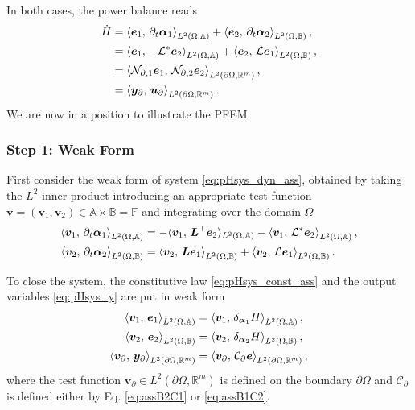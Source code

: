 In both cases, the power balance reads
\begin{equation}\label{eq:powbal_2}
\begin{aligned}
\dot{H} &= \inner[L^2(\Omega, \mathbb{A})]{\bm{e}_1}{\partial_{t} \bm{\alpha}_1} + \inner[L^2(\Omega, \mathbb{B})]{\bm{e}_2}{\partial_{t} \bm{\alpha}_2}, \\
&=\inner[L^2(\Omega, \mathbb{A})]{\bm{e}_1}{-\mathcal{L}^* \bm{e}_2} + \inner[L^2(\Omega, \mathbb{B})]{\bm{e}_2}{\mathcal{L} \bm{e}_1}, \\
&= \inner[L^2(\partial \Omega, \mathbb{R}^m)]{\mathcal{N}_{\partial, 1} \bm{e}_1}{\mathcal{N}_{\partial, 2} \bm{e}_2}, \\
&= \inner[L^2(\partial \Omega, \mathbb{R}^m)]{\bm{y}_\partial}{\bm{u}_\partial}.
\end{aligned}
\end{equation}
We are now in a position to illustrate the PFEM. 

{\centering \subsubsection*{Step 1: Weak Form}} 
First consider the weak form of system \eqref{eq:pHsys_dyn_ass}, obtained by taking the $L^2$ inner product introducing an appropriate test function $\bm{v} = (\bm{v}_1, \bm{v}_2) \in \mathbb{A} \times \mathbb{B} = \mathbb{F}$ and integrating over the domain $\Omega$
\begin{equation}\label{eq:weak_dyn}
\begin{aligned}
\inner[L^2(\Omega, \mathbb{A})]{\bm{v}_1}{\partial_t \bm{\alpha}_1} &= -  \langle{\bm{v}_1},\,{\bm{L}^\top \bm{e}_2}\rangle_{L^2(\Omega, \mathbb{A})} -  \inner[L^2(\Omega, \mathbb{A})]{\bm{v}_1}{\mathcal{L}^*\bm{e}_2}, \\
\inner[L^2(\Omega, \mathbb{B})]{\bm{v}_2}{\partial_t \bm{\alpha}_2} &= \inner[L^2(\Omega, \mathbb{B})]{\bm{v}_2}{\bm{L}\bm{e}_1}+ \inner[L^2(\Omega, \mathbb{B})]{\bm{v}_2}{\mathcal{L}\bm{e}_1}.
\end{aligned}
\end{equation}



To close the system, the constitutive law \eqref{eq:pHsys_const_ass} and the output variables \eqref{eq:pHsys_y} are put in weak form
\begin{equation}
\begin{aligned}
\inner[L^2(\Omega, \mathbb{A})]{\bm{v}_1}{\bm{e}_1}&= \inner[L^2(\Omega, \mathbb{A})]{\bm{v}_1}{\delta_{\bm{\alpha}_1} H}, \\
\inner[L^2(\Omega, \mathbb{B})]{\bm{v}_2}{\bm{e}_2}&= \inner[L^2(\Omega, \mathbb{B})]{\bm{v}_2}{\delta_{\bm{\alpha}_2} H}, \\
\inner[L^2(\partial \Omega, \mathbb{R}^m)]{\bm{v}_\partial}{\bm{y}_\partial} &= \inner[L^2(\partial \Omega, \mathbb{R}^m)]{\bm{v}_\partial}{\mathcal{C}_\partial \bm{e}},
\end{aligned}
\end{equation}
where the test function $\bm{v}_\partial \in L^2(\partial \Omega, \mathbb{R}^m)$ is defined on the boundary $\partial\Omega$ and $\mathcal{C}_\partial$ is defined either by Eq. \eqref{eq:assB2C1} or  \eqref{eq:assB1C2}.


